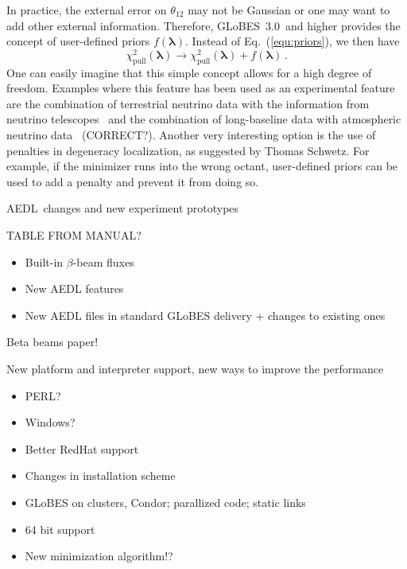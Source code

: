 \documentclass[12pt,a4paper]{article}
\makeatletter
\renewcommand{\section}{\@startsection{section}{1}{0em}{-\baselineskip}%
{\baselineskip}{\normalfont\large\bfseries}}
\newcommand{\eq}{Eq.}
\newcommand{\bi}{\begin{itemize}}
\newcommand{\ei}{\end{itemize}}
\newcommand{\GLOBESN}{{\sf GLoBES~3.0}}
\newcommand{\AEDL}{{\sf AEDL}}
\newcommand{\equ}[1]{\eq~(\ref{equ:#1})}
\makeatother
\begin{document}
In practice, the external error on $\theta_{12}$ may not be Gaussian or one may
want to add other external information. Therefore,
\GLOBESN\ and higher provides the concept of user-defined priors  $f(\boldsymbol{\lambda})$. 
Instead of \equ{priors}, we then have
\begin{equation}
 \chi^2_{\mathrm{pull}}(\boldsymbol{\lambda}) \rightarrow \chi^2_{\mathrm{pull}}(\boldsymbol{\lambda})  + f(\boldsymbol{\lambda}) \, .
\label{equ:userpriors}
\end{equation}
One can easily imagine that this simple concept allows for a high degree of freedom. Examples where
this feature has been used as an experimental feature are the combination of terrestrial neutrino
data with the information from neutrino telescopes~\cite{Winter:2006ce} and the combination of long-baseline data with atmospheric neutrino data~\cite{Huber:2005ep,Campagne:2006yx} (CORRECT?).
Another very interesting option is the use of penalties in degeneracy localization, as suggested by Thomas
Schwetz. For example, if the minimizer runs into the wrong octant, user-defined priors can be
used to add a penalty and prevent it from doing so.

\section{\AEDL\ changes and new experiment prototypes}

TABLE FROM MANUAL?

\bi
\item 
 Built-in $\beta$-beam fluxes
\item
 New AEDL features
\item
 New AEDL files in standard GLoBES delivery + changes to existing ones
\ei

Beta beams paper!

\section{New platform and interpreter support, new ways to improve the performance}

\bi
\item
 PERL?
\item 
 Windows?
\item
 Better RedHat support
\item
 Changes in installation scheme
\ei


\bi
\item 
 GLoBES on clusters, Condor; parallized code; static links
\item 
 64 bit support
\item 
 New minimization algorithm!?
\ei
\end{document}
